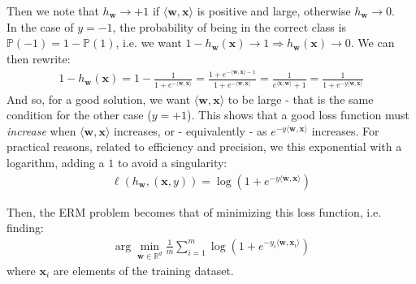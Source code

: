 \documentclass[../template.tex]{subfiles}
\begin{document}
Then we note that $h_{\bm{w}} \to +1$ if $\langle \bm{w}, \bm{x} \rangle$ is positive and large, otherwise $h_{\bm{w}} \to 0$.\\
In the case of $y=-1$, the probability of being in the correct class is $\mathbb{P}(-1) = 1- \mathbb{P}(1)$, i.e. we want $1- h_{\bm{w}}(\bm{x}) \to 1 \Rightarrow h_{\bm{w}}(\bm{x}) \to 0$. We can then rewrite:
\begin{align*}
    1-h_{\bm{w}}(\bm{x}) = 1-\frac{1}{1+ e^{-\langle \bm{w}, \bm{x} \rangle}} = \frac{1 + e^{-\langle \bm{w}, \bm{x} \rangle -1}}{1 + e^{-\langle \bm{w}, \bm{x} \rangle}} = \frac{1}{e^{\langle \bm{x}, \bm{w} \rangle} +1}  = \frac{1}{1+e^{-y \langle \bm{w}, \bm{x} \rangle}} 
\end{align*}
And so, for a good solution, we want $\langle \bm{w}, \bm{x} \rangle$ to be large - that is the same condition for the other case ($y = +1$). This shows that a good loss function must \textit{increase} when $\langle \bm{w}, \bm{x }\rangle$ increases, or - equivalently - as $e^{-y \langle \bm{w}, \bm{x} \rangle}$ increases. For practical reasons, related to efficiency and precision, we  this exponential with a logarithm, adding a $1$ to avoid a singularity:
\begin{align*}
    \ell (h_{\bm{w}}, (\bm{x}, y)) = \log(1 + e^{-y \langle \bm{w}, \bm{x} \rangle})
\end{align*} 

Then, the ERM problem becomes that of minimizing this loss function, i.e. finding:
\begin{align*}
    \arg\min_{\bm{w} \in \mathbb{R}^d} \frac{1}{m} \sum_{i=1}^{m} \log(1+ e^{-y_i \langle \bm{w}, \bm{x}_i \rangle}) 
\end{align*}
where $\bm{x}_i$ are elements of the training dataset.
\end{document}
